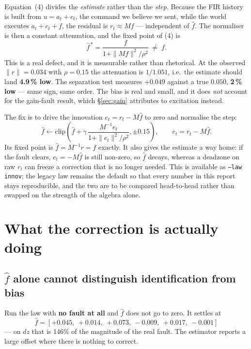 \documentclass[11pt,a4paper]{article}
\newcommand{\code}[1]{\texttt{\small #1}}
\newcommand{\fhat}{\hat{f}}
\begin{document}
Equation~(4) divides the \emph{estimate} rather than the \emph{step}. Because the FIR
history is built from $u = a_t + c_t$, the command we believe we sent, while the world
executes $a_t + c_t + f$, the residual is $r_t \approx M f$ --- independent of $\fhat$.
The normaliser is then a constant attenuation, and the fixed point of (4) is
%
\begin{equation}
\fhat^{\,\star} = \frac{f}{1 + \|Mf\|^2/\rho^2} \;\neq\; f .
\end{equation}
%
This is a real defect, and it is measurable rather than rhetorical. At the observed
$\|r\| = 0.034$ with $\rho = 0.15$ the attenuation is $1/1.051$, i.e.\ the estimate should
land \textbf{4.9\,\% low}. The separation test measures $+0.049$ against a true $0.050$,
\textbf{2\,\% low} --- same sign, same order. The bias is real and small, and it does
\emph{not} account for the gain-fault result, which \S\ref{sec:gain} attributes to
excitation instead.

The fix is to drive the innovation $e_t = r_t - M\fhat$ to zero and normalise the step:
%
\begin{equation}
\fhat \leftarrow \mathrm{clip}\!\left(
  \fhat + \gamma\,\frac{M^{-1} e_t}{1 + \|e_t\|^2/\rho^2}, \pm 0.15 \right),
  \qquad e_t = r_t - M\fhat .
\end{equation}
%
Its fixed point is $\fhat = M^{-1} r = f$ exactly. It also gives the estimate a way home:
if the fault clears, $e_t = -M\fhat$ is still non-zero, so $\fhat$ decays, whereas a
deadzone on raw $r_t$ can freeze a correction that is no longer needed. This is available
as \code{--law innov}; the legacy law remains the default so that every number in this
report stays reproducible, and the two are to be compared head-to-head rather than
swapped on the strength of the algebra alone.

\section{What the correction is actually doing}
\label{sec:phantom}

\subsection{\texorpdfstring{$\fhat$}{f-hat} alone cannot distinguish identification from bias}

Run the law with \textbf{no fault at all} and $\fhat$ does not go to zero. It
settles at
\[ \hat f = [+0.045,\ +0.014,\ +0.073,\ -0.009,\ +0.017,\ -0.001] \]
--- on $dz$ that is 146\% of the magnitude of the real fault. The estimator reports a large offset
where there is nothing to correct.
\end{document}
